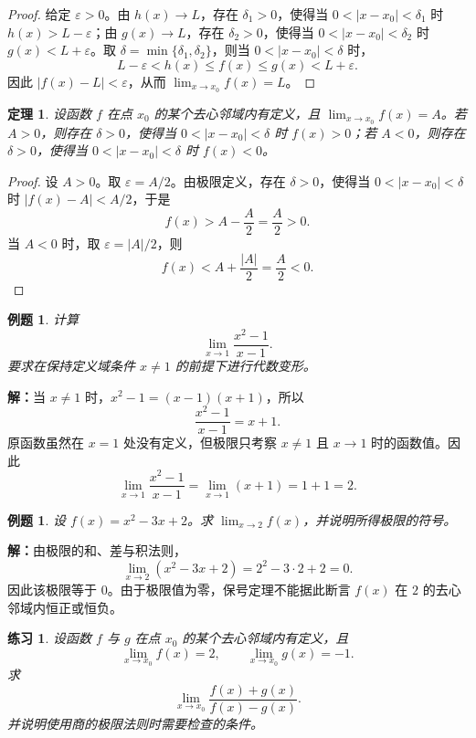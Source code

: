 \documentclass[UTF8,fontset=fandol,11pt]{ctexart}
\newtheorem{theorem}[definition]{定理}
\newtheorem{example}[definition]{例题}
\newtheorem{exercise}[definition]{练习}
\begin{document}
\begin{proof}
给定 $\varepsilon>0$。由 $h(x)\to L$，存在 $\delta_1>0$，使得当 $0<|x-x_0|<\delta_1$ 时 $h(x)>L-\varepsilon$；由 $g(x)\to L$，存在 $\delta_2>0$，使得当 $0<|x-x_0|<\delta_2$ 时 $g(x)<L+\varepsilon$。取 $\delta=\min\{\delta_1,\delta_2\}$，则当 $0<|x-x_0|<\delta$ 时，
\[
L-\varepsilon<h(x)\leq f(x)\leq g(x)<L+\varepsilon.
\]
因此 $|f(x)-L|<\varepsilon$，从而 $\lim_{x\to x_0}f(x)=L$。
\end{proof}
\begin{theorem}
设函数 $f$ 在点 $x_0$ 的某个去心邻域内有定义，且 $\lim_{x\to x_0}f(x)=A$。若 $A>0$，则存在 $\delta>0$，使得当 $0<|x-x_0|<\delta$ 时 $f(x)>0$；若 $A<0$，则存在 $\delta>0$，使得当 $0<|x-x_0|<\delta$ 时 $f(x)<0$。\label{thm:limit-sign-preservation}
\end{theorem}
\begin{proof}
设 $A>0$。取 $\varepsilon=A/2$。由极限定义，存在 $\delta>0$，使得当 $0<|x-x_0|<\delta$ 时 $|f(x)-A|<A/2$，于是
\[
f(x)>A-\frac{A}{2}=\frac{A}{2}>0.
\]
当 $A<0$ 时，取 $\varepsilon=|A|/2$，则
\[
f(x)<A+\frac{|A|}{2}=\frac{A}{2}<0.
\]

\end{proof}
\begin{example}
计算
\[
\lim_{x\to1}\frac{x^2-1}{x-1}.
\]
要求在保持定义域条件 $x\neq1$ 的前提下进行代数变形。
\end{example}
\par\noindent\textbf{解：}当 $x\neq1$ 时，$x^2-1=(x-1)(x+1)$，所以
\[
\frac{x^2-1}{x-1}=x+1.
\]
原函数虽然在 $x=1$ 处没有定义，但极限只考察 $x\neq1$ 且 $x\to1$ 时的函数值。因此
\[
\lim_{x\to1}\frac{x^2-1}{x-1}=\lim_{x\to1}(x+1)=1+1=2.
\]\par
\begin{example}
设 $f(x)=x^2-3x+2$。求 $\lim_{x\to2}f(x)$，并说明所得极限的符号。
\end{example}
\par\noindent\textbf{解：}由极限的和、差与积法则，
\[
\lim_{x\to2}(x^2-3x+2)=2^2-3\cdot2+2=0.
\]
因此该极限等于 $0$。由于极限值为零，保号定理不能据此断言 $f(x)$ 在 $2$ 的去心邻域内恒正或恒负。\par
\begin{exercise}
\label{mathagent:exercise:b4c9c9a1fb82bcef052fdbf6e1539831ed88cee016dbcbf83a50e5e8d2311be0}
设函数 $f$ 与 $g$ 在点 $x_0$ 的某个去心邻域内有定义，且
\[
\lim_{x\to x_0}f(x)=2,
\qquad
\lim_{x\to x_0}g(x)=-1.
\]
求
\[
\lim_{x\to x_0}\frac{f(x)+g(x)}{f(x)-g(x)}.
\]
并说明使用商的极限法则时需要检查的条件。
\end{exercise}
\end{document}
